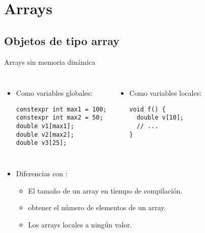 \section{Arrays}

\subsection{Objetos de tipo array}

\begin{frame}[t,fragile]{Arrays sin memoria dinámica}
\begin{columns}[T]
\begin{itemize}
  \item Como variables globales:
\begin{lstlisting}
constexpr int max1 = 100;
constexpr int max2 = 50;
double v1[max1];
double v2[max2];
double v3[25];
\end{lstlisting}
\end{itemize}

\begin{itemize}
  \item Como variables locales:
\begin{lstlisting}
void f() {
  double v[10];
  // ...
}
\end{lstlisting}
\end{itemize}

\end{columns}

\begin{itemize}
  \item Diferencias con :
    \begin{itemize}
      \item El tamaño de un array  en tiempo de compilación.
      \item {} obtener el número de elementos de un array.
      \item Los arrays locales  a ningún valor.
    \end{itemize}
\end{itemize}
\end{frame}

